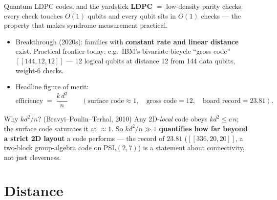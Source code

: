 \documentclass[11pt,aspectratio=169]{beamer}
\begin{document}
\begin{frame}{Quantum LDPC codes, and the yardstick}
  \textbf{LDPC} $=$ low-density parity checks: every check touches $O(1)$ qubits
  and every qubit sits in $O(1)$ checks --- the property that makes syndrome
  measurement practical.
  \begin{itemize}\setlength{\itemsep}{6pt}
    \item Breakthrough (2020s): families with \textbf{constant rate and linear
          distance} exist. Practical frontier today: e.g.\ IBM's
          bivariate-bicycle ``gross code'' $[[144,12,12]]$ --- 12 logical
          qubits at distance 12 from 144 data qubits, weight-6 checks.
    \item Headline figure of merit:
          \[ \text{efficiency} \;=\; \frac{k\,d^2}{n}
             \qquad (\text{surface code} \approx 1,\quad
                     \text{gross code} = 12,\quad
                     \text{board record} = 23.81). \]
  \end{itemize}
  \begin{block}{Why $kd^2/n$? (Bravyi--Poulin--Terhal, 2010)}
    Any 2D-\emph{local} code obeys $kd^2 \le c\,n$; the surface code saturates
    it at $\approx 1$. So $kd^2/n \gg 1$ \textbf{quantifies how far beyond a
    strict 2D layout} a code performs --- the record of $23.81$
    ($[[336,20,20]]$, a two-block group-algebra code on $\mathrm{PSL}(2,7)$)
    is a statement about connectivity, not just cleverness.
  \end{block}
\end{frame}

\section{Distance}
\end{document}
